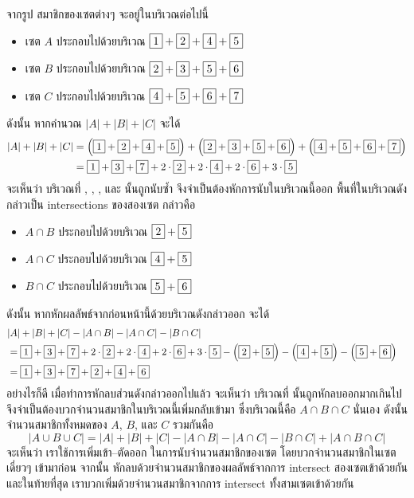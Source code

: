 \documentclass[a4paper,12pt,twoside]{article}
\begin{document}
\begin{example}
จากรูป สมาชิกของเซตต่างๆ จะอยู่ในบริเวณต่อไปนี้
\begin{itemize}[]
\item เซต $A$ ประกอบไปด้วยบริเวณ $\fbox{1}+\fbox{2}+\fbox{4}+\fbox{5}$
\item เซต $B$ ประกอบไปด้วยบริเวณ $\fbox{2}+\fbox{3}+\fbox{5}+\fbox{6}$
\item เซต $C$ ประกอบไปด้วยบริเวณ $\fbox{4}+\fbox{5}+\fbox{6}+\fbox{7}$
\end{itemize}
ดังนั้น หากคำนวณ $|A|+|B|+|C|$ จะได้
\begin{align*}
|A|+|B|+|C|
&= \left(\fbox{1}+\fbox{2}+\fbox{4}+\fbox{5}\right) + \left(\fbox{2}+\fbox{3}+\fbox{5}+\fbox{6}\right) + \left(\fbox{4}+\fbox{5}+\fbox{6}+\fbox{7}\right) \\
&= \fbox{1}+\fbox{3}+\fbox{7}+2\cdot\fbox{2}+2\cdot\fbox{4}+2\cdot\fbox{6}+3\cdot\fbox{5}
\end{align*}
จะเห็นว่า บริเวณที่ , , , และ  นั้นถูกนับซ้ำ จึงจำเป็นต้องหักการนับในบริเวณนี้ออก \enskip พื้นที่ในบริเวณดังกล่าวเป็น intersections ของสองเซต กล่าวคือ
\begin{itemize}[]
\item $A\cap B$ ประกอบไปด้วยบริเวณ $\fbox{2}+\fbox{5}$
\item $A\cap C$ ประกอบไปด้วยบริเวณ $\fbox{4}+\fbox{5}$
\item $B\cap C$ ประกอบไปด้วยบริเวณ $\fbox{5}+\fbox{6}$
\end{itemize}
ดังนั้น หากหักผลลัพธ์จากก่อนหน้านี้ด้วยบริเวณดังกล่าวออก จะได้
\begin{align*}
\lefteqn{|A|+|B|+|C|-|A\cap B|-|A\cap C|-|B\cap C|} \\
&= \cnode{1}+\cnode{3}+\cnode{7}+2\cdot\cnode{2}+2\cdot\cnode{4}+2\cdot\cnode{6}+3\cdot\cnode{5} - \left(\cnode{2}+\cnode{5}\right) - \left(\cnode{4}+\cnode{5}\right) - \left(\cnode{5}+\cnode{6}\right) \\
&= \cnode{1}+\cnode{3}+\cnode{7}+\cnode{2}+\cnode{4}+\cnode{6}
\end{align*}
อย่างไรก็ดี เมื่อทำการหักลบส่วนดังกล่าวออกไปแล้ว จะเห็นว่า บริเวณที่  นั้นถูกหักลบออกมากเกินไป จึงจำเป็นต้องบวกจำนวนสมาชิกในบริเวณนี้เพิ่มกลับเข้ามา ซึ่งบริเวณนี้คือ $A\cap B\cap C$ นั่นเอง \enskip ดังนั้น จำนวนสมาชิกทั้งหมดของ $A$, $B$, และ $C$ รวมกันคือ
\[|A\cup B\cup C|=|A|+|B|+|C|-|A\cap B|-|A\cap C|-|B\cap C|+|A\cap B\cap C|\]
จะเห็นว่า เราใช้การเพิ่มเข้า--ตัดออก ในการนับจำนวนสมาชิกของเซต โดยบวกจำนวนสมาชิกในเซตเดี่ยวๆ เข้ามาก่อน จากนั้น หักลบด้วยจำนวนสมาชิกของผลลัพธ์จากการ intersect สองเซตเข้าด้วยกัน และในท้ายที่สุด เราบวกเพิ่มด้วยจำนวนสมาชิกจากการ intersect ทั้งสามเซตเข้าด้วยกัน
\end{example}
\end{document}
